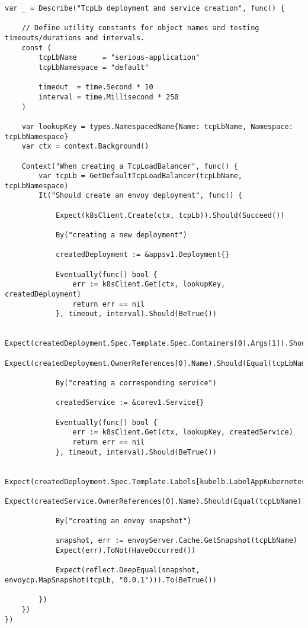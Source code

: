\begin{lstlisting}[caption={TCPLoadBalancer controller integration test}, label={lst:controller-test}]
var _ = Describe("TcpLb deployment and service creation", func() {

	// Define utility constants for object names and testing timeouts/durations and intervals.
	const (
		tcpLbName      = "serious-application"
		tcpLbNamespace = "default"

		timeout  = time.Second * 10
		interval = time.Millisecond * 250
	)

	var lookupKey = types.NamespacedName{Name: tcpLbName, Namespace: tcpLbNamespace}
	var ctx = context.Background()

	Context("When creating a TcpLoadBalancer", func() {
		var tcpLb = GetDefaultTcpLoadBalancer(tcpLbName, tcpLbNamespace)
		It("Should create an envoy deployment", func() {

			Expect(k8sClient.Create(ctx, tcpLb)).Should(Succeed())

			By("creating a new deployment")

			createdDeployment := &appsv1.Deployment{}

			Eventually(func() bool {
				err := k8sClient.Get(ctx, lookupKey, createdDeployment)
				return err == nil
			}, timeout, interval).Should(BeTrue())

			Expect(createdDeployment.Spec.Template.Spec.Containers[0].Args[1]).Should(Equal(envoyServer.GenerateBootstrap()))
			Expect(createdDeployment.OwnerReferences[0].Name).Should(Equal(tcpLbName))

			By("creating a corresponding service")

			createdService := &corev1.Service{}

			Eventually(func() bool {
				err := k8sClient.Get(ctx, lookupKey, createdService)
				return err == nil
			}, timeout, interval).Should(BeTrue())

			Expect(createdDeployment.Spec.Template.Labels[kubelb.LabelAppKubernetesName]).Should(Equal(createdService.Spec.Selector[kubelb.LabelAppKubernetesName]))
			Expect(createdService.OwnerReferences[0].Name).Should(Equal(tcpLbName))

			By("creating an envoy snapshot")

			snapshot, err := envoyServer.Cache.GetSnapshot(tcpLbName)
			Expect(err).ToNot(HaveOccurred())

			Expect(reflect.DeepEqual(snapshot, envoycp.MapSnapshot(tcpLb, "0.0.1"))).To(BeTrue())

		})
	})
})
\end{lstlisting}
